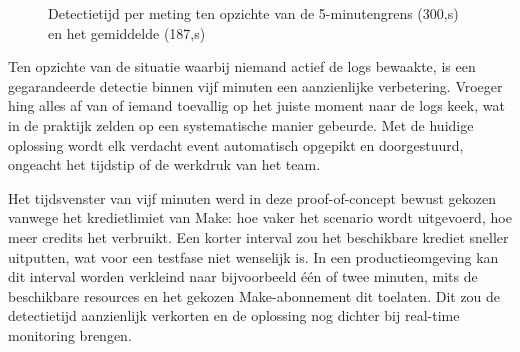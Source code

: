 \begin{figure}[H]
    \centering
    \caption{Detectietijd per meting ten opzichte van de 5-minutengrens (300,s) en het gemiddelde (187,s)}
    \label{fig:detectiesnelheid}
\end{figure}

Ten opzichte van de situatie waarbij niemand actief de logs bewaakte, is een gegarandeerde detectie binnen vijf minuten een aanzienlijke verbetering. Vroeger hing alles af van of iemand toevallig op het juiste moment naar de logs keek, wat in de praktijk zelden op een systematische manier gebeurde. Met de huidige oplossing wordt elk verdacht event automatisch opgepikt en doorgestuurd, ongeacht het tijdstip of de werkdruk van het team.

Het tijdsvenster van vijf minuten werd in deze proof-of-concept bewust gekozen vanwege het kredietlimiet van Make: hoe vaker het scenario wordt uitgevoerd, hoe meer credits het verbruikt. Een korter interval zou het beschikbare krediet sneller uitputten, wat voor een testfase niet wenselijk is. In een productieomgeving kan dit interval worden verkleind naar bijvoorbeeld één of twee minuten, mits de beschikbare resources en het gekozen Make-abonnement dit toelaten. Dit zou de detectietijd aanzienlijk verkorten en de oplossing nog dichter bij real-time monitoring brengen.

